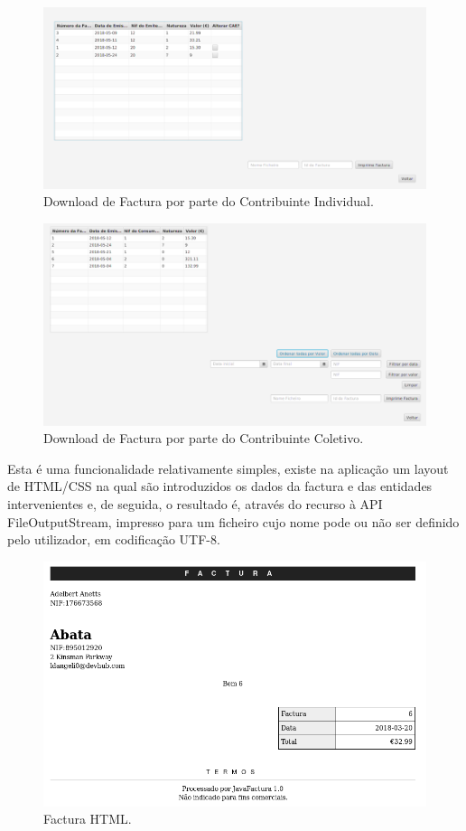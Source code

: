 \documentclass[a4paper]{article}
\begin{document}
\begin{figure}[H]
\centering
\includegraphics[scale=0.35]{imgs/consultafaturas.png}
\caption{Download de Factura por parte do Contribuinte Individual.}
\label{img:downloadfaturaci}
\end{figure}

\begin{figure}[H]
\centering
\includegraphics[scale=0.35]{imgs/consultarFaturas.png}
\caption{Download de Factura por parte do Contribuinte Coletivo.}
\label{img:downloadfaturacc}
\end{figure}

Esta é uma funcionalidade relativamente simples, existe na aplicação um
layout de HTML/CSS na qual são introduzidos os dados da factura e das
entidades intervenientes e, de seguida, o resultado é, através do recurso à API
FileOutputStream, impresso para um ficheiro cujo nome pode ou não ser definido
pelo utilizador, em codificação UTF-8.

\begin{figure}[H]
\centering
\includegraphics[scale=0.35]{imgs/factura.png}
\caption{Factura HTML.}
\label{img:factura}
\end{figure}
\end{document}
